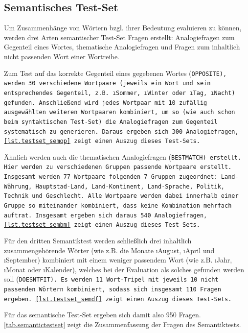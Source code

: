 \subsection{Semantisches Test-Set}\label{ss.semantictestset}
Um Zusammenhänge von Wörtern bzgl. ihrer Bedeutung evaluieren zu können, werden drei Arten semantischer Test-Set Fragen erstellt: Analogiefragen zum Gegenteil eines Wortes, thematische Analogiefragen und Fragen zum inhaltlich nicht passenden Wort einer Wortreihe.

Zum Test auf das korrekte Gegenteil eines gegebenen Wortes (\tt{OPPOSITE}), werden 30 verschiedene Wortpaare (jeweils ein Wort und sein entsprechendes Gegenteil, z.B. \i{Sommer}, \i{Winter} oder \i{Tag}, \i{Nacht}) gefunden. Anschließend wird jedes Wortpaar mit 10 zufällig ausgewählten weiteren Wortpaaren kombiniert, um so (wie auch schon beim syntaktischen Test-Set) die Analogiefragen zum Gegenteil systematisch zu generieren. Daraus ergeben sich 300 Analogiefragen, \autoref{lst.testset_semop} zeigt einen Auszug dieses Test-Sets.

Ähnlich werden auch die thematischen Analogiefragen (\tt{BESTMATCH}) erstellt. Hier werden zu verschiedenen Gruppen passende Wortpaare erstellt. Insgesamt werden 77 Wortpaare folgenden 7 Gruppen zugeordnet: Land-Währung, Hauptstad-Land, Land-Kontinent, Land-Sprache, Politik, Technik und Geschlecht. Alle Wortpaare werden dabei innerhalb einer Gruppe so miteinander kombiniert, dass keine Kombination mehrfach auftrat. Insgesamt ergeben sich daraus 540 Analogiefragen, \autoref{lst.testset_sembm} zeigt einen Auszug dieses Test-Sets.

Für den dritten Semantiktest werden schließlich drei inhaltlich zusammengehörende Wörter (wie z.B. die Monate \i{August}, \i{April} und \i{September}) kombiniert mit einem weniger passendem Wort (wie z.B. \i{Jahr}, \i{Monat} oder \i{Kalender}), welches bei der Evaluation als solches gefunden werden soll (\tt{DOESNTFIT}). Es werden 11 Wort-Tripel mit jeweils 10 nicht passenden Wörtern kombiniert, sodass sich insgesamt 110 Fragen ergeben. \autoref{lst.testset_semdf} zeigt einen Auszug dieses Test-Sets.

Für das semantische Test-Set ergeben sich damit also 950 Fragen. \autoref{tab.semantictestset} zeigt die Zusammenfassung der Fragen des Semantiktests.

